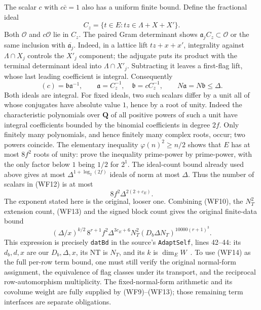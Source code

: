 The scalar $c$ with $c\bar c=1$ also has a uniform
finite bound.  Define the fractional ideal
\[
                  C_z=\{t\in E:tz\in\Lambda+X+X'\}.
\]
Both $\mathcal O$ and $c\mathcal O$ lie in $C_z$.
The paired Gram determinant shows
$\mathfrak a_jC_z\subset\mathcal O$ or the same
inclusion with $\overline{\mathfrak a_j}$.
Indeed, in a lattice lift $tz+x+x'$, integrality
against $\Lambda\cap X_j$ controls the $X'_j$
component; the adjugate puts its product with the
terminal determinant ideal into $\Lambda\cap X'_j$.
Subtracting it leaves a first-flag lift, whose last
leading coefficient is integral.
Consequently
\[
        (c)=\mathfrak b\mathfrak a^{-1},\qquad
        \mathfrak a=C_z^{-1},\quad
        \mathfrak b=cC_z^{-1},\qquad
        N\mathfrak a=N\mathfrak b\leq\Delta.
 \tag{WF12}
\]
Both ideals are integral.  For fixed ideals, two such
scalars differ by a unit all of whose conjugates have
absolute value $1$, hence by a root of unity.
Indeed the characteristic polynomials over $\mathbf Q$
of all positive powers of such a unit have integral
coefficients bounded by the binomial coefficients in
degree $2f$.  Only finitely many polynomials, and hence
finitely many complex roots, occur; two powers coincide.
The
elementary inequality $\varphi(n)^2\geq n/2$ shows
that $E$ has at most $8f^2$ roots of unity: prove the
inequality prime-power by prime-power, with the only
factor below $1$ being $1/2$ for $2^1$.
The ideal-count bound already used above gives at most
$\Delta^{1+\log_2(2f)}$ ideals of norm at most $\Delta$.
Thus the number of scalars in (WF12) is at most
\[
                     8f^2\Delta^{2(2+c_E)}.
 \tag{WF13}
\]
The exponent stated here is the original, looser one.
Combining (WF10), the $N_T^2$ extension count, (WF13)
and the signed block count gives the original finite-data
bound
\[
 (\Delta/x)^{k/2}\,
 8^{r+1}f^2\Delta^{3c_E+6}N_T^2
                   (D_b\Delta N_T)^{10000(r+1)^3}.
 \tag{WF14}
\]
This expression is precisely \texttt{datBd} in the source's
\texttt{AdaptSelf}, lines 42--44: its $d_b,d,x$ are
our $D_b,\Delta,x$, its $\mathrm{NT}$ is $N_T$, and
its $k$ is $\dim_EW$~\cite{weighted-flag-lattice-source}.
To use (WF14) as the full per-row term bound, one must
still verify the original normal-form assignment,
the equivalence of flag classes under its transport,
and the reciprocal row-automorphism multiplicity.
The fixed-normal-form arithmetic and its covolume
weight are fully supplied by (WF9)--(WF13); those
remaining term interfaces are separate obligations.
